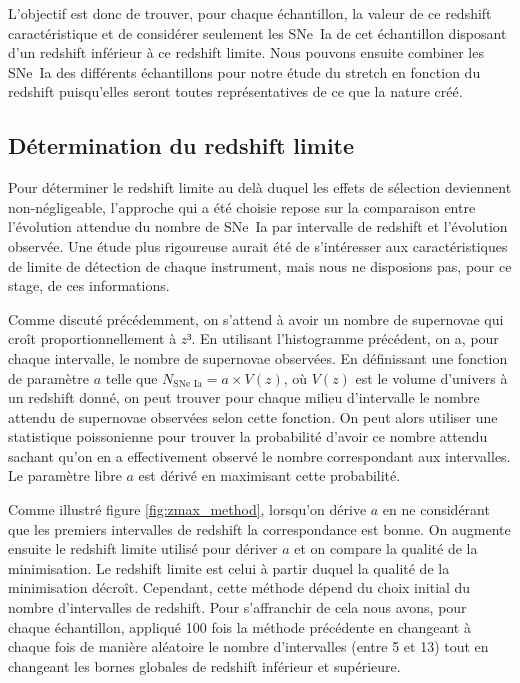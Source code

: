 \documentclass[a4paper, 12pt, svgnames]{article}
\begin{document}
L'objectif est donc de trouver, pour chaque échantillon, la valeur de ce
redshift caractéristique et de considérer seulement les SNe~Ia de cet
échantillon disposant d'un redshift inférieur à ce redshift limite. Nous pouvons
ensuite combiner les SNe~Ia des différents échantillons pour notre étude du
stretch en fonction du redshift puisqu'elles seront toutes représentatives de ce
que la nature créé.

\subsection{Détermination du redshift limite}\label{ssec:det}

Pour déterminer le redshift limite au delà duquel les effets de sélection
deviennent non-négligeable, l'approche qui a été choisie repose sur la
comparaison entre l'évolution attendue du nombre de SNe~Ia par intervalle de
redshift et l'évolution observée. Une étude plus rigoureuse aurait été de
s'intéresser aux caractéristiques de limite de détection de chaque instrument,
mais nous ne disposions pas, pour ce stage, de ces informations.

Comme discuté précédemment, on s'attend à avoir un nombre de supernovae qui
croît proportionnellement à $z³$. En utilisant l'histogramme précédent, on a,
pour chaque intervalle, le nombre de supernovae observées. En définissant une
fonction de paramètre $a$ telle que $N_{\text{SNe~Ia}} = a\times V(z)$, où
$V(z)$ est le volume d'univers à un redshift donné, on peut trouver pour chaque
milieu d'intervalle le nombre attendu de supernovae observées selon cette
fonction. On peut alors utiliser une statistique poissonienne pour trouver la
probabilité d'avoir ce nombre attendu sachant qu'on en a effectivement observé
le nombre correspondant aux intervalles. Le paramètre libre $a$ est dérivé
en maximisant cette probabilité.

Comme illustré figure \ref{fig:zmax_method}, lorsqu'on dérive $a$ en ne
considérant que les premiers intervalles de redshift la correspondance est
bonne. On augmente ensuite le redshift limite utilisé pour dériver $a$ et on
compare la qualité de la minimisation. Le redshift limite est celui à partir
duquel la qualité de la minimisation décroît. Cependant, cette méthode dépend du
choix initial du nombre d'intervalles de redshift. Pour s'affranchir de cela
nous avons, pour chaque échantillon, appliqué 100 fois la méthode précédente en
changeant à chaque fois de manière aléatoire le nombre d'intervalles (entre 5 et
13) tout en changeant les bornes globales de redshift inférieur et supérieure.
\end{document}
